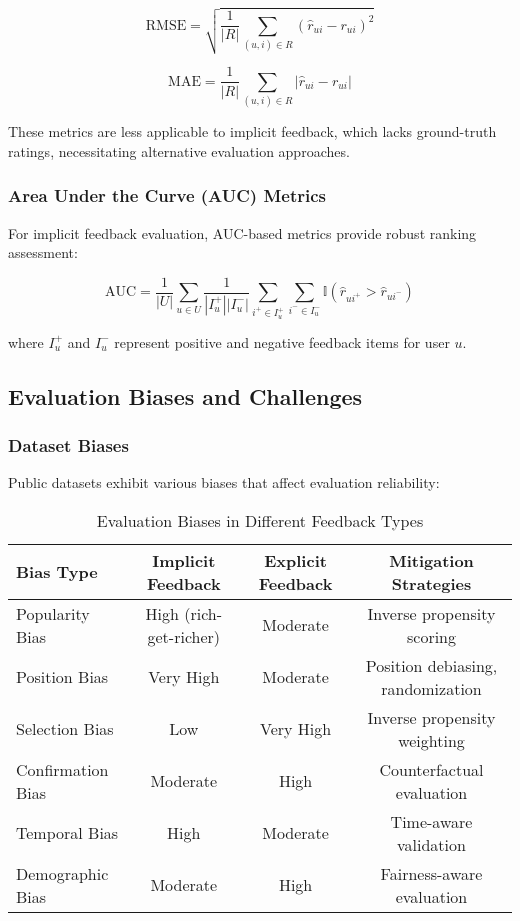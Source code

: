 \documentclass[acmsmall,review,anonymous]{acmart}
\begin{document}
\begin{equation}
\text{RMSE} = \sqrt{\frac{1}{|R|} \sum_{(u,i) \in R} (\hat{r}_{ui} - r_{ui})^2}
\label{eq:rmse}
\end{equation}

\begin{equation}
\text{MAE} = \frac{1}{|R|} \sum_{(u,i) \in R} |\hat{r}_{ui} - r_{ui}|
\label{eq:mae}
\end{equation}

These metrics are less applicable to implicit feedback, which lacks ground-truth ratings, necessitating alternative evaluation approaches.

\subsubsection{Area Under the Curve (AUC) Metrics}
For implicit feedback evaluation, AUC-based metrics provide robust ranking assessment:

\begin{equation}
\text{AUC} = \frac{1}{|U|} \sum_{u \in U} \frac{1}{|I_u^+||I_u^-|} \sum_{i^+ \in I_u^+} \sum_{i^- \in I_u^-} \mathbb{I}(\hat{r}_{ui^+} > \hat{r}_{ui^-})
\label{eq:auc}
\end{equation}

where $I_u^+$ and $I_u^-$ represent positive and negative feedback items for user $u$.

\subsection{Evaluation Biases and Challenges}

\subsubsection{Dataset Biases}
Public datasets exhibit various biases that affect evaluation reliability:

\begin{table}[h]
\centering
\caption{Evaluation Biases in Different Feedback Types}
\label{tab:evaluation_biases}
\begin{tabular}{@{}lccc@{}}
\toprule
Bias Type & Implicit Feedback & Explicit Feedback & Mitigation Strategies \\
\midrule
Popularity Bias & High (rich-get-richer) & Moderate & Inverse propensity scoring \\
Position Bias & Very High & Moderate & Position debiasing, randomization \\
Selection Bias & Low & Very High & Inverse propensity weighting \\
Confirmation Bias & Moderate & High & Counterfactual evaluation \\
Temporal Bias & High & Moderate & Time-aware validation \\
Demographic Bias & Moderate & High & Fairness-aware evaluation \\
\bottomrule
\end{tabular}
\end{table}
\end{document}
